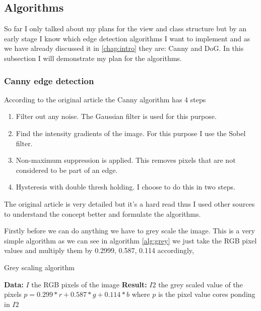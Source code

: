 \subsection{Algorithms}
\label{chap:algo}

So far I only talked about my plans for the view and class structure but by an early stage I know which edge detection algorithms I want to implement and as we have already discussed it in \autoref{chap:intro} they are: \ac{Canny} and \ac{DoG}. In this subsection I will demonstrate my plan for the algorithms.

\subsubsection{Canny edge detection}

According to the original article\cite{canny:paper} the \ac{Canny} algorithm has 4 steps

\begin{enumerate}
\item Filter out any noise. The Gaussian filter is used for this purpose.
\item Find the intensity gradients of the image. For this purpose I use the Sobel filter.
\item Non-maximum suppression is applied. This removes pixels that are not considered to be part of an edge.
\item Hysteresis with double thresh holding. I choose to do this in two steps.
\end{enumerate}

The original article\cite{canny:paper} is very detailed but it's a hard read thus I used other sources\cite{canny:imp}\cite{canny:imp2} to understand the concept better and formulate the algorithms.

Firstly before we can do anything we have to grey scale the image. This is a very simple algorithm as we can see in algorithm \ref{alg:grey} we just take the RGB pixel values and multiply them by 0.2999, 0.587, 0.114 accordingly,

\begin{algorithm}[H]
\caption{Grey scaling algorithm}
\label{alg:grey}
\begin{algorithmic}
\State \textbf{Data:} $I$ the RGB pixels of the image
\State \textbf{Result:} $I2$ the grey scaled value of the pixels
\State $p = 0.299 * r + 0.587 * g + 0.114 * b$
\State where $p$ is the pixel value cores ponding in $I2$
\EndFor
\end{algorithmic}
\end{algorithm}

